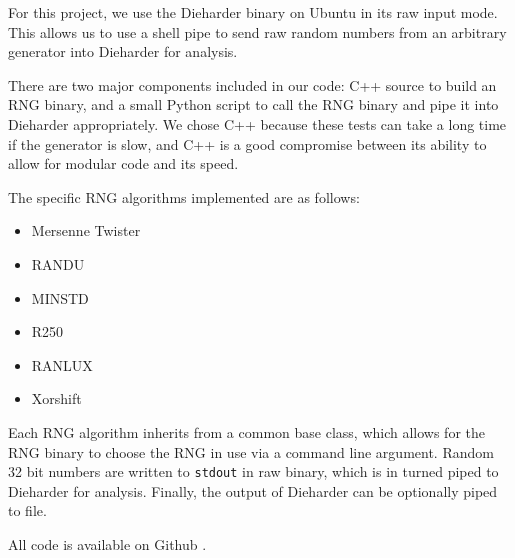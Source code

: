 For this project, we use the Dieharder binary on Ubuntu in its raw input mode. This allows us to use a shell pipe to send raw random numbers from an arbitrary generator into Dieharder for analysis.

There are two major components included in our code: C++ source to build an RNG binary, and a small Python script to call the RNG binary and pipe it into Dieharder appropriately. We chose C++ because these tests can take a long time if the generator is slow, and C++ is a good compromise between its ability to allow for modular code and its speed.

The specific RNG algorithms implemented are as follows:
\begin{itemize}
    \item Mersenne Twister
    \item RANDU
    \item MINSTD
    \item R250
    \item RANLUX
    \item Xorshift
\end{itemize}
Each RNG algorithm inherits from a common base class, which allows for the RNG binary to choose the RNG in use via a command line argument. Random 32 bit numbers are written to \texttt{stdout} in raw binary, which is in turned piped to Dieharder for analysis. Finally, the output of Dieharder can be optionally piped to file.

All code is available on Github \cite{github_repo}.
